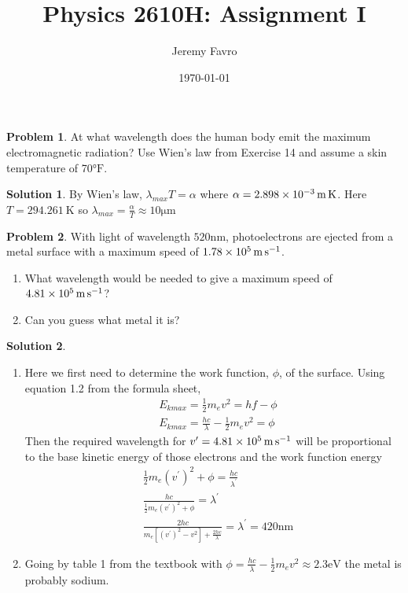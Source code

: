 \documentclass[10pt]{article}
\title{Physics 2610H: Assignment I}
\author{Jeremy Favro}
\date{\today}
\theoremstyle{definition}
\newtheorem{problem}{Problem}
\newtheorem{soln}{Solution}
\begin{document}
\maketitle

\begin{problem}
At what wavelength does the human body emit the maximum electromagnetic radiation? Use Wien's law from Exercise 14 and assume a skin
temperature of 70$\unit{\degree}\mathrm{F}$.
\end{problem}
\begin{soln}
  By Wien's law, $\lambda_{max}T=\alpha$ where $\alpha=\qty{2.898d-3}{\meter\kelvin}$. Here $T=\qty{294.261}{\kelvin}$ so $\lambda_{max}=\frac{\alpha}{T}\approx10\unit{\micro\meter}$
\end{soln}

\begin{problem}
With light of wavelength $520\unit{\nano\meter}$, photoelectrons are ejected from a metal surface with a maximum speed of $\qty{1.78d5}{\meter\per\second}$.
\begin{enumerate}[label=(\alph*)]
  \item What wavelength would be needed to give a maximum speed of $\qty{4.81d5}{\meter\per\second}$?
  \item Can you guess what metal it is?
\end{enumerate}
\end{problem}
\begin{soln}
  ~\begin{enumerate}[label=(\alph*)]
    \item Here we first need to determine the work function, $\phi$, of the surface. Using equation 1.2 from the formula sheet,
          \begin{align*}
             & E_{kmax}=\frac{1}{2}m_ev^2=hf-\phi                 \\
             & E_{kmax}=\frac{hc}{\lambda}-\frac{1}{2}m_ev^2=\phi
          \end{align*}
          Then the required wavelength for $v^\prime=\qty{4.81d5}{\meter\per\second}$ will be proportional to the base kinetic energy of those electrons and the work function energy
          \begin{align*}
             & \frac{1}{2}m_e\left(v^\prime\right)^2+\phi=\frac{hc}{\lambda^\prime}                                             \\
             & \frac{hc}{\frac{1}{2}m_e\left(v^\prime\right)^2+\phi}=\lambda^\prime                                             \\
             & \frac{2hc}{m_e\left[\left(v^\prime\right)^2-v^2\right]+\frac{2hc}{\lambda}}=\lambda^\prime=420\unit{\nano\meter}
          \end{align*}
    \item Going by table 1 from the textbook with $\phi=\frac{hc}{\lambda}-\frac{1}{2}m_ev^2\approx2.3\unit{\electronvolt}$ the metal is probably sodium.
  \end{enumerate}
\end{soln}
\end{document}
